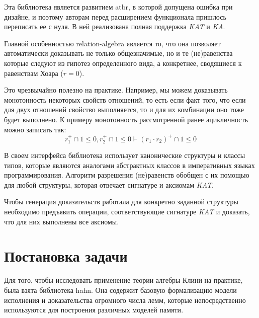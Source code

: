 \documentclass[times
              ]{itmo-student-thesis}
\begin{document}
      Эта библиотека является развитием atbr, в которой допущена ошибка при дизайне, и поэтому
      авторам перед расширением функционала пришлось переписать ее с нуля. В ней реализована полная
      поддержка \textit{KAT} и \textit{KA}.

      Главной особенностью relation-algebra является то, что она позволяет автоматически доказывать
      не только общезначимые, но и те (не)равенства которые следуют из гипотез определенного вида, а
      конкретнее, сводящиеся к равенствам Хоара ($ r = 0 $).

      Это чрезвычайно полезно на практике.
      Например, мы можем доказывать монотонность некоторых свойств отношений,
      то есть если факт того, что если для двух отношений свойство выполняется, то и для их комбинации
      оно тоже будет выполнено.
      К примеру монотонность рассмотренной ранее ацикличность можно записать так:
      $$ r_1^+ \cap 1 \leq 0, r_2^+ \cap 1 \leq 0 \vdash (r_1 \cdot r_2)^+ \cap 1 \leq 0 $$

      В своем интерфейса библиотека использует канонические структуры и классы типов, которые являются
      аналогами абстрактных классов в императивных языках программирования.
      Алгоритм разрешения (не)равенств обобщен с их помощью для любой структуры, которая отвечает
      сигнатуре и аксиомам \textit{KAT}.

      Чтобы генерация доказательств работала для конкретно заданной структуры необходимо предъявить
      операции, соответствующие сигнатуре \textit{KAT} и доказать, что для них выполнены все аксиомы.

\finishrelatedwork

  \section{Постановка задачи}


    Для того, чтобы исследовать применение теории алгебры Клини на практике, была взята библиотека hahn\cite{hahn}.
    Она содержит базовую формализацию модели исполнения и доказательства огромного числа лемм, которые
    непосредственно используются для построения различных моделей памяти\cite{imm}.
\end{document}
